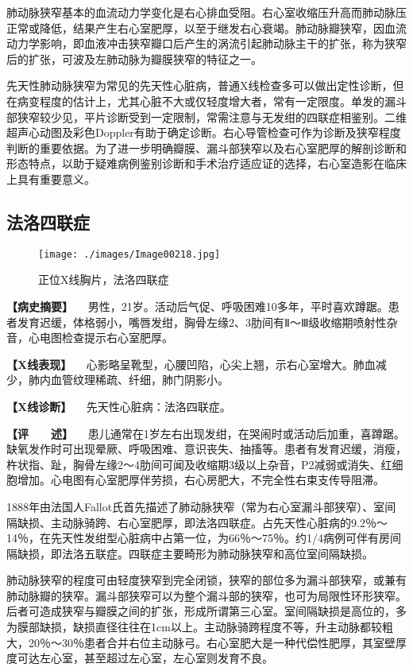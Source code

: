 肺动脉狭窄基本的血流动力学变化是右心排血受阻。右心室收缩压升高而肺动脉压正常或降低，结果产生右心室肥厚，以至于继发右心衰竭。肺动脉瓣狭窄，因血流动力学影响，即血液冲击狭窄瓣口后产生的涡流引起肺动脉主干的扩张，称为狭窄后的扩张，可波及左肺动脉为瓣膜狭窄的特征之一。

先天性肺动脉狭窄为常见的先天性心脏病，普通X线检查多可以做出定性诊断，但在病变程度的估计上，尤其心脏不大或仅轻度增大者，常有一定限度。单发的漏斗部狭窄较少见，平片诊断受到一定限制，常需注意与无发绀的四联症相鉴别。二维超声心动图及彩色Doppler有助于确定诊断。右心导管检查可作为诊断及狭窄程度判断的重要依据。为了进一步明确瓣膜、漏斗部狭窄以及右心室肥厚的解剖诊断和形态特点，以助于疑难病例鉴别诊断和手术治疗适应证的选择，右心室造影在临床上具有重要意义。

\subsection{法洛四联症}

\begin{figure}[!htbp]
 \centering
 \texttt{[image: ./images/Image00218.jpg]}
 \captionsetup{justification=centering}
 \caption{正位X线胸片，法洛四联症}
 \label{fig4-2-5}
  \end{figure} 

\textbf{【病史摘要】}
　男性，21岁。活动后气促、呼吸困难10多年，平时喜欢蹲踞。患者发育迟缓，体格弱小，嘴唇发绀，胸骨左缘2、3肋间有Ⅱ～Ⅲ级收缩期喷射性杂音，心电图检查提示右心室肥厚。

\textbf{【X线表现】}
　心影略呈靴型，心腰凹陷，心尖上翘，示右心室增大。肺血减少，肺内血管纹理稀疏、纤细，肺门阴影小。

\textbf{【X线诊断】} 　先天性心脏病：法洛四联症。

\textbf{【评　　述】}
　患儿通常在1岁左右出现发绀，在哭闹时或活动后加重，喜蹲踞。缺氧发作时可出现晕厥、呼吸困难、意识丧失、抽搐等。患者有发育迟缓，消瘦，杵状指、趾，胸骨左缘2～4肋间可闻及收缩期3级以上杂音，P2减弱或消失、红细胞增加。心电图有心室肥厚伴劳损，右心房肥大，不完全性右束支传导阻滞。

1888年由法国人Fallot氏首先描述了肺动脉狭窄（常为右心室漏斗部狭窄）、室间隔缺损、主动脉骑跨、右心室肥厚，即法洛四联症。占先天性心脏病的9.2％～14％，在先天性发绀型心脏病中占第一位，为66％～75％。约1/4病例可伴有房间隔缺损，即法洛五联症。四联症主要畸形为肺动脉狭窄和高位室间隔缺损。

肺动脉狭窄的程度可由轻度狭窄到完全闭锁，狭窄的部位多为漏斗部狭窄，或兼有肺动脉瓣的狭窄。漏斗部狭窄可以为整个漏斗部的狭窄，也可为局限性环形狭窄。后者可造成狭窄与瓣膜之间的扩张，形成所谓第三心室。室间隔缺损是高位的，多为膜部缺损，缺损直径往往在1cm以上。主动脉骑跨程度不等，升主动脉都较粗大，20％～30％患者合并右位主动脉弓。右心室肥大是一种代偿性肥厚，其室壁厚度可达左心室，甚至超过左心室，左心室则发育不良。

